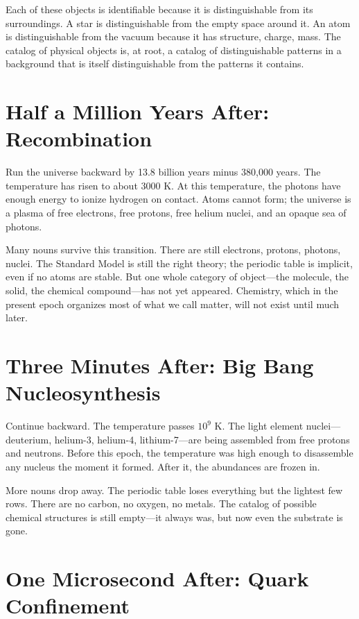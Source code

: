 \documentclass[11pt,a4paper]{book}
\begin{document}
Each of these objects is identifiable because it is distinguishable from its surroundings. A star is distinguishable from the empty space around it. An atom is distinguishable from the vacuum because it has structure, charge, mass. The catalog of physical objects is, at root, a catalog of distinguishable patterns in a background that is itself distinguishable from the patterns it contains.

\section*{Half a Million Years After: Recombination}

Run the universe backward by 13.8 billion years minus 380{,}000 years. The temperature has risen to about $3000$ K. At this temperature, the photons have enough energy to ionize hydrogen on contact. Atoms cannot form; the universe is a plasma of free electrons, free protons, free helium nuclei, and an opaque sea of photons.

Many nouns survive this transition. There are still electrons, protons, photons, nuclei. The Standard Model is still the right theory; the periodic table is implicit, even if no atoms are stable. But one whole category of object---the molecule, the solid, the chemical compound---has not yet appeared. Chemistry, which in the present epoch organizes most of what we call matter, will not exist until much later.

\section*{Three Minutes After: Big Bang Nucleosynthesis}

Continue backward. The temperature passes $10^9$ K. The light element nuclei---deuterium, helium-3, helium-4, lithium-7---are being assembled from free protons and neutrons. Before this epoch, the temperature was high enough to disassemble any nucleus the moment it formed. After it, the abundances are frozen in.

More nouns drop away. The periodic table loses everything but the lightest few rows. There are no carbon, no oxygen, no metals. The catalog of possible chemical structures is still empty---it always was, but now even the substrate is gone.

\section*{One Microsecond After: Quark Confinement}
\end{document}
